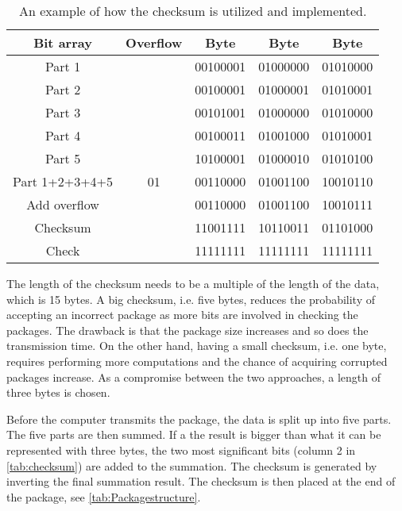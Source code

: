 \begin{table}[H]
\centering
\begin{tabular}{|c|c|c|c|c|}
\hline
Bit array      & Overflow   & Byte 	   & Byte 	  & Byte		 \\ \hline
Part 1         & 		    & 00100001 & 01000000 & 01010000    \\ \hline
Part 2         & 		    & 00100001 & 01000001 & 01010001    \\ \hline
Part 3         & 		    & 00101001 & 01000000 & 01010000    \\ \hline
Part 4         & 		    & 00100011 & 01001000 & 01010001    \\ \hline
Part 5         & 		    & 10100001 & 01000010 & 01010100    \\ \hline
Part 1+2+3+4+5 & 01	        & 00110000 & 01001100 & 10010110 	 \\ \hline
Add overflow   & 		    & 00110000 & 01001100 & 10010111    \\ \hline
Checksum       & 		    & 11001111 & 10110011 & 01101000    \\ \hline
Check          & 		    & 11111111 & 11111111 & 11111111    \\ \hline
\end{tabular}
\caption{An example of how the checksum is utilized and implemented.}
\label{tab:checksum}
\end{table}
The length of the checksum needs to be a multiple of the length of the data, which is 15 bytes. A big checksum, i.e. five bytes, reduces the probability of accepting an incorrect package as more bits are involved in checking the packages. The drawback is that the package size increases and so does the transmission time. On the other hand, having a small checksum, i.e. one byte, requires performing more computations and the chance of acquiring corrupted packages increase. As a compromise between the two approaches, a length of three bytes is chosen.

Before the computer transmits the package, the data is split up into five parts. The five parts are then summed. If a the result is bigger than what it can be represented with three bytes, the two most significant bits (column 2 in \autoref{tab:checksum}) are added to the summation. The checksum is generated by inverting the final summation result. The checksum is then placed at the end of the package, see \autoref{tab:Packagestructure}.

